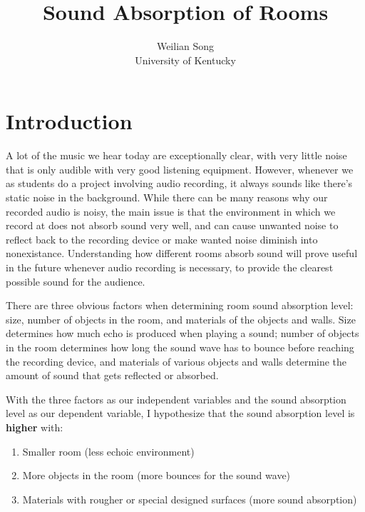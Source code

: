 \documentclass[12pt,onecolumn,letterpaper,draftclsnofoot]{article}
\begin{document}
\title{Sound Absorption of Rooms}

\author{Weilian Song\\
University of Kentucky\\
}

\maketitle

\section{Introduction}

A lot of the music we hear today are exceptionally clear, with very little
noise that is only audible with very good listening equipment. However,
whenever we as students do a project involving audio recording, it always
sounds like there's static noise in the background. While there can be many
reasons why our recorded audio is noisy, the main issue is that the
environment in which we record at does not absorb sound very well, and can
cause unwanted noise to reflect back to the recording device or make wanted
noise diminish into nonexistance. Understanding how different rooms absorb
sound will prove useful in the future whenever audio recording is necessary,
to provide the clearest possible sound for the audience.

There are three obvious factors when determining room sound absorption level:
size, number of objects in the room, and materials of the objects and walls.
Size determines how much echo is produced when playing a sound; number of
objects in the room determines how long the sound wave has to bounce before
reaching the recording device, and materials of various objects and walls
determine the amount of sound that gets reflected or absorbed.

With the three factors as our independent variables and the sound absorption
level as our dependent variable, I hypothesize that the sound absorption level
is \textbf{higher} with:

\begin{enumerate}
  \item Smaller room (less echoic environment)
  \item More objects in the room (more bounces for the sound wave)
  \item Materials with rougher or special designed surfaces (more sound
        absorption)
\end{enumerate}
\end{document}
